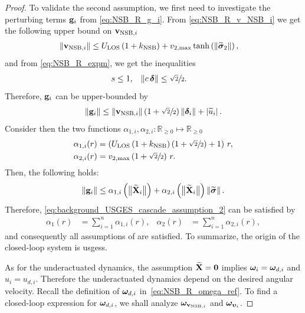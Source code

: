 \begin{proof}
    To validate the second assumption, we first need to investigate the perturbing terms $\mathbf{g}_i$ from \eqref{eq:NSB_R_g_i}.
    From \eqref{eq:NSB_R_v_NSB_i} we get the following upper bound on $\mathbf{v}_{{\rm NSB}, i}$ 
    \begin{align}
        \left\|\mathbf{v}_{{\rm NSB}, i}\right\| &\leq U_{\rm LOS}\left(1 + k_{\rm NSB}\right) + v_{2, \max}\tanh\left(\left\|\widetilde{\bm{\sigma}}_2\right\|\right),
    \end{align}
    and from \eqref{eq:NSB_R_expm}, we get the inequalities 
    \begin{align}
        s &\leq 1, &
        \left\|c\,\bm{\delta}\right\| &\leq \sfrac{\sqrt{2}}{2}.
    \end{align}
    Therefore, $\mathbf{g}_i$ can be upper-bounded by 
    \begin{equation}
        \left\|\mathbf{g}_i\right\| \leq \left\|\mathbf{v}_{{\rm NSB}, i}\right\|\left(1 + \sfrac{\sqrt{2}}{2}\right)\left\|\bm{\delta}_i\right\| + \left|\widetilde{u}_i\right|.
    \end{equation}
    Consider then the two functions $\alpha_{1,i}, \alpha_{2,i} : \mathbb{R}_{\geq 0} \mapsto \mathbb{R}_{\geq 0}$ 
    \begin{align}
        \alpha_{1,i}(r) &= \left(U_{\rm LOS}\left(1 + k_{\rm NSB}\right)\left(1 + \sfrac{\sqrt{2}}{2}\right) + 1\right)\,r, \\
        \alpha_{2,i}(r) &= v_{2, \max}\left(1 + \sfrac{\sqrt{2}}{2}\right)\,r.
    \end{align}
    Then, the following holds: 
    \begin{equation}
        \left\|\mathbf{g}_i\right\| \leq \alpha_{1,i}\left(\bigl\|\widetilde{\mathbf{X}}_i\bigr\|\right) + 
                            \alpha_{2,i}\left(\bigl\|\widetilde{\mathbf{X}}_i\bigr\|\right)\left\|\widetilde{\bm{\sigma}}\right\|. \label{eq:NSB_R_perturbing_term}
    \end{equation}
    Therefore, \eqref{eq:background_USGES_cascade_assumption_2} can be satisfied by 
    \begin{align}
        \alpha_1(r) &= \sum_{i=1}^n \alpha_{1,i}(r), &
        \alpha_2(r) &= \sum_{i=1}^n \alpha_{2,i}(r),
    \end{align}
    and consequently all assumptions of \cite[Proposition~9]{pettersen_lyapunov_2017} are satisfied. To summarize, the origin of the closed-loop system is \glspl{usges}.

    

    As for the underactuated dynamics, the assumption $\widetilde{\mathbf{X}} = \mathbf{0}$ implies $\bm{\omega}_i = \bm{\omega}_{d, i}$ and $u_i = u_{d, i}$.
    Therefore the underactuated dynamics depend on the desired angular velocity.
    Recall the definition of $\bm{\omega}_{d, i}$ in~\eqref{eq:NSB_R_omega_ref}.
    To find a closed-loop expression for $\bm{\omega}_{d, i}$, we shall analyze $\bm{\omega}_{\mathbf{v}_{{\rm NSB}, i}}$ and $\bm{\omega}_{\bm{\upsilon}_{i}}$.


\end{proof}
